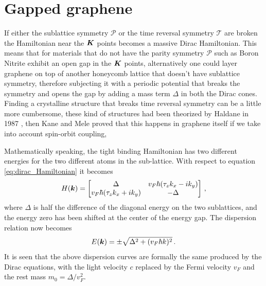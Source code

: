 \section{Gapped graphene}
\label{sec:gapped-graphene}
If either the sublattice symmetry $\mathcal P$ or the time reversal symmetry $\mathcal T$ are broken the Hamiltonian near the $\boldsymbol{K}$ points becomes a massive Dirac Hamiltonian.
This means that for materials that do not have the parity symmetry $\mathcal P$ such as Boron Nitrite exhibit an open gap in the $\boldsymbol{K}$ points, alternatively one could layer graphene on top of another honeycomb lattice that doesn't have sublattice symmetry, therefore subjecting it with a periodic potential that breaks the symmetry and opens the gap by adding a mass term $\Delta$ in both the Dirac cones.\\
Finding a crystalline structure that breaks time reversal symmetry can be a little more cumbersome, these kind of structures had been theorized by Haldane in 1987 \cite{haldane1988model}, then Kane and Mele \cite{kane2005quantum} proved that this happens in graphene itself if we take into account spin-orbit coupling, 


Mathematically speaking, the tight binding Hamiltonian has two different energies for the two different atoms in the sub-lattice. With respect to equation \ref{eq:dirac_Hamiltonian} it becomes
\begin{equation}
    H(\boldsymbol{k})=
    \begin{bmatrix}
        \Delta& v_F\hbar(\tau_zk_x-ik_y)\\
        v_F\hbar(\tau_zk_x+ik_y)&-\Delta
    \end{bmatrix}
    \label{eq:gapped-dirac}\,,
\end{equation}
where $\Delta$ is half the difference of the diagonal energy on the two sublattices, and the energy zero has been shifted at the center of the energy gap. The dispersion relation now becomes
\begin{equation}
    E(\boldsymbol{k})=\pm\sqrt{\Delta^2 + (v_F\hbar k)^2}\,.
\end{equation}
It is seen that the above dispersion curves are formally the same produced by the Dirac equations, with the light velocity $c$ replaced by the Fermi velocity $v_F$ and the rest mass $m_0=\Delta/v_F^2$.

